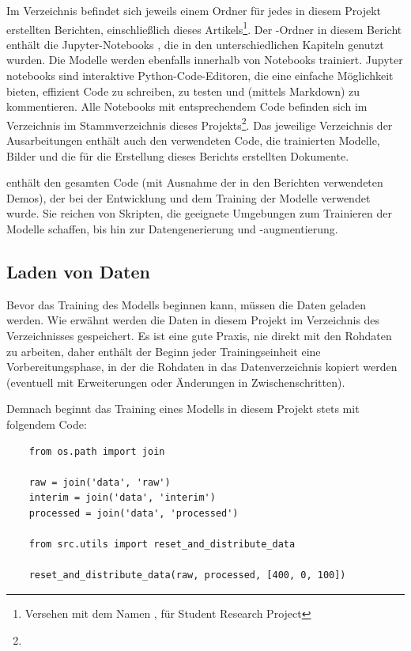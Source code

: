 Im  Verzeichnis befindet sich jeweils einem Ordner für jedes in diesem Projekt erstellten Berichten, einschließlich dieses Artikels\footnote{Versehen mit dem Namen , für Student Research Project}.
Der -Ordner in diesem Bericht enthält die Jupyter-Notebooks \cite{Jupyter2019}, die in den unterschiedlichen Kapiteln genutzt wurden.
Die Modelle werden ebenfalls innerhalb von  Notebooks trainiert. 
Jupyter notebooks sind interaktive Python-Code-Editoren, die eine einfache Möglichkeit bieten, effizient Code zu schreiben, zu testen und (mittels Markdown) zu kommentieren.
Alle Notebooks mit entsprechendem Code befinden sich im Verzeichnis  im Stammverzeichnis dieses Projekts\footnote{}.
Das jeweilige Verzeichnis der Ausarbeitungen enthält auch den verwendeten Code, die trainierten Modelle, Bilder und die für die Erstellung dieses Berichts erstellten Dokumente.

 enthält den gesamten Code (mit Ausnahme der in den Berichten verwendeten Demos), der bei der Entwicklung und dem Training der Modelle verwendet wurde. Sie reichen von Skripten, die geeignete Umgebungen zum Trainieren der Modelle schaffen, bis hin zur Datengenerierung und -augmentierung.

\subsection{Laden von Daten}

Bevor das Training des Modells beginnen kann, müssen die Daten geladen werden.
Wie erwähnt werden die Daten in diesem Projekt im Verzeichnis  des Verzeichnisses  gespeichert.
Es ist eine gute Praxis, nie direkt mit den Rohdaten zu arbeiten, daher enthält der Beginn jeder Trainingseinheit eine Vorbereitungsphase, in der die Rohdaten in das  Datenverzeichnis kopiert werden (eventuell mit Erweiterungen oder Änderungen in Zwischenschritten).

Demnach beginnt das Training eines Modells in diesem Projekt stets mit folgendem Code:

\begin{lstlisting}
    from os.path import join
    
    raw = join('data', 'raw')
    interim = join('data', 'interim')
    processed = join('data', 'processed')
        
    from src.utils import reset_and_distribute_data
        
    reset_and_distribute_data(raw, processed, [400, 0, 100])
\end{lstlisting}

